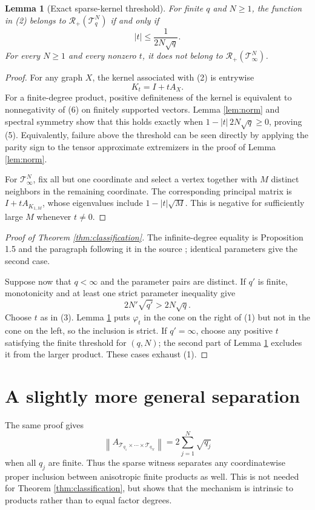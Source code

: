 \documentclass[11pt]{article}
\newtheorem{lemma}[theorem]{Lemma}
\newcommand{\Rcone}{\mathcal R_+}
\newcommand{\Ttree}{\mathcal T}
\begin{document}
\begin{lemma}[Exact sparse-kernel threshold]\label{lem:sparse}
For finite $q$ and $N\ge1$, the function in (2) belongs to
$\Rcone(\Ttree_q^N)$ if and only if
\[
 |t|\le\frac1{2N\sqrt q}. \tag{5}
\]
For every $N\ge1$ and every nonzero $t$, it does not belong to
$\Rcone(\Ttree_\infty^N)$.
\end{lemma}

\begin{proof}
For any graph $X$, the kernel associated with (2) is entrywise
\[
 K_t=I+tA_X. \tag{6}
\]
For a finite-degree product, positive definiteness of the kernel is equivalent
to nonnegativity of (6) on finitely supported vectors.  Lemma \ref{lem:norm}
and spectral symmetry show that this holds exactly when
$1-|t|\,2N\sqrt q\ge0$, proving (5).  Equivalently, failure above the threshold
can be seen directly by applying the parity sign to the tensor approximate
extremizers in the proof of Lemma \ref{lem:norm}.

For $\Ttree_\infty^N$, fix all but one coordinate and select a vertex together
with $M$ distinct neighbors in the remaining coordinate.  The corresponding
principal matrix is $I+tA_{K_{1,M}}$, whose eigenvalues include
$1-|t|\sqrt M$.  This is negative for sufficiently large $M$ whenever
$t\ne0$.
\end{proof}

\begin{proof}[Proof of Theorem \ref{thm:classification}]
The infinite-degree equality is Proposition 1.5 and the paragraph following it
in the source \cite{Vergara}; identical parameters give the second case.

Suppose now that $q<\infty$ and the parameter pairs are distinct.  If $q'$ is
finite, monotonicity and at least one strict parameter inequality give
\[
 2N'\sqrt{q'}>2N\sqrt q.
\]
Choose $t$ as in (3).  Lemma \ref{lem:sparse} puts $\varphi_t$ in the cone on
the right of (1) but not in the cone on the left, so the inclusion is strict.
If $q'=\infty$, choose any positive $t$ satisfying the finite threshold for
$(q,N)$; the second part of Lemma \ref{lem:sparse} excludes it from the larger
product.  These cases exhaust (1).
\end{proof}

\section{A slightly more general separation}

The same proof gives
\[
 \left\|A_{\Ttree_{q_1}\times\cdots\times\Ttree_{q_N}}\right\|
 =2\sum_{j=1}^N\sqrt{q_j} \tag{7}
\]
when all $q_j$ are finite.  Thus the sparse witness separates any coordinatewise
proper inclusion between anisotropic finite products as well.  This is not
needed for Theorem \ref{thm:classification}, but shows that the mechanism is
intrinsic to products rather than to equal factor degrees.
\end{document}
